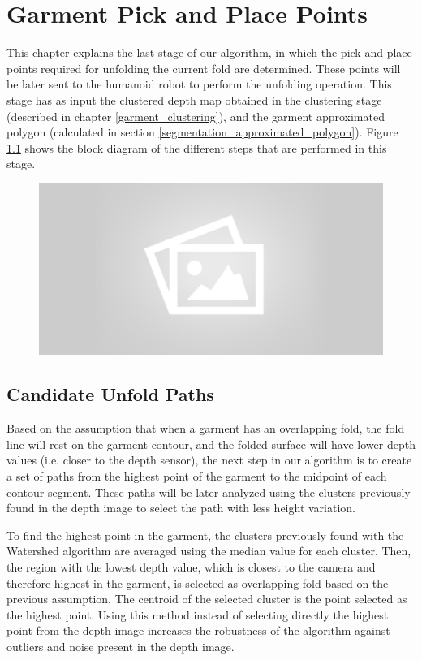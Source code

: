 \chapter{Garment Pick and Place Points}
\label{pick_and_place}
This chapter explains the last stage of our algorithm, in which the pick and place points required for unfolding the current fold are determined. These points will be later sent to the humanoid robot to perform the unfolding operation. This stage has as input the clustered depth map obtained in the clustering stage (described in chapter \ref{garment_clustering}), and the garment approximated polygon (calculated in section \ref{segmentation_approximated_polygon}). Figure \ref{fig:garment_pnp_points_blocks} shows the block diagram of the different steps that are performed in this stage.

\begin{figure}[thpb]
    \centering
    \includegraphics[width=0.7
    \textwidth]{figures/placeholder2.png}
    \caption{}
    \label{fig:garment_pnp_points_blocks}
\end{figure}

\section{Candidate Unfold Paths}
\label{unfold_paths}

Based on the assumption that when a garment has an overlapping fold, the fold line will rest on the garment contour, and the folded surface will have lower depth values (i.e. closer to the depth sensor), the next step in our algorithm is to create a set of paths from the highest point of the garment to the midpoint of each contour segment. These paths will be later analyzed using the clusters previously found in the depth image to select the path with less height variation.

To find the highest point in the garment, the clusters previously found with the Watershed algorithm are averaged using the median value for each cluster. Then, the region with the lowest depth value, which is closest to the camera and therefore highest in the garment, is selected as overlapping fold based on the previous assumption. The centroid of the selected cluster is the point selected as the highest point. Using this method instead of selecting directly the highest point from the depth image increases the robustness of the algorithm against outliers and noise present in the depth image.

